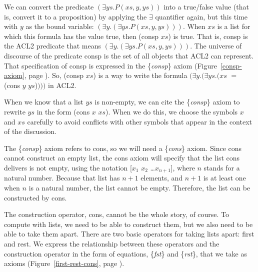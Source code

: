 We can convert the predicate $(\exists ys.P(xs, y, ys))$
into a true/false value (that is, convert it to a proposition)
by applying the $\exists$ quantifier again,
but this time with $y$ as the bound variable:
$(\exists y.(\exists ys.P(xs, y, ys)))$.
When $xs$ is a list for which this formula has the value true,
then \textsf{(consp $xs$)} is true.
That is, \textsf{consp} is the ACL2 predicate that means $(\exists y.(\exists ys.P(xs, y, ys)))$.
The universe of discourse of the predicate \textsf{consp}
is the set of all objects that ACL2 can represent.
That specification of \textsf{consp} is expressed in the \{\emph{consp}\} axiom
(Figure~\ref{consp-axiom}, page \pageref{consp-axiom}).
So, \textsf{(consp $xs$)} is a way to write the formula
$(\exists y.(\exists ys.(xs$ $=$ \textsf{(cons $y$ $ys$)}$)))$ in ACL2.

When we know that a list $ys$ is non-empty,
we can cite the \{\emph{consp}\} axiom
to rewrite $ys$ in the form \textsf{(cons $x$ $xs$)}.
When we do this, we choose the symbols $x$ and $xs$ carefully
to avoid conflicts with other symbols that appear in the context of the discussion.

The \{\emph{consp}\} axiom refers to \textsf{cons},
so we will need a \{\emph{cons}\} axiom.
Since \textsf{cons} cannot construct an empty list,
the cons axiom will specify that the list \textsf{cons} delivers is not empty,
using the notation \textsf{[$x_1$ $x_2$ \dots $x_{n+1}$]},
where $n$ stands for a natural number.
Because that list has $n+1$ elements, and $n+1$
is at least one when $n$ is a natural number,
the list cannot be empty.
Therefore, the list can be constructed by \textsf{cons}.

The construction operator, \textsf{cons}, cannot be the whole story, of course.
To compute with lists, we  need to be able to construct them,
but we also need to be able to take them apart.
There are two basic operators for taking lists apart: \textsf{first} and \textsf{rest}.
We express the relationship between these operators and
the construction operator in the form of equations,
\{\emph{fst}\} and \{\emph{rst}\}, that we take as axioms
(Figure~\ref{first-rest-cons}, page \pageref{first-rest-cons}).

